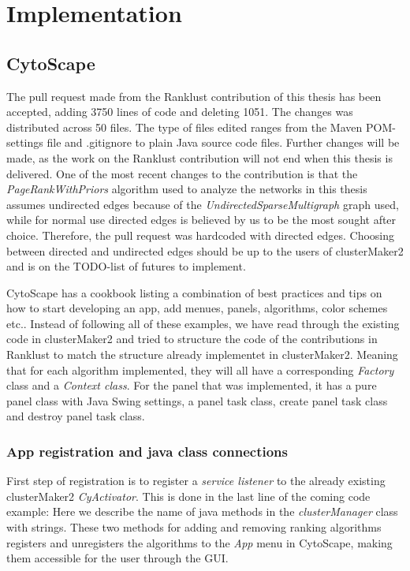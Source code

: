 \part{Implementation}
\label{pa:implementation}
\chapter{CytoScape}
The pull request\cite{git-pull-request} made from the Ranklust
contribution of this thesis has been accepted\cite{ranklust-accepted}, adding
3750 lines of code and deleting 1051. The changes was distributed across 50
files. The type of files edited ranges from the Maven POM-settings file and
.gitignore to plain Java source code files. Further changes will be made, as the
work on the Ranklust contribution will not end when this thesis is delivered.
One of the most recent changes to the contribution is that the
\textit{PageRankWithPriors} algorithm used to analyze the networks in this
thesis assumes undirected edges because of the
\textit{UndirectedSparseMultigraph} graph used, while for normal use directed
edges is believed by us to be the most sought after choice. Therefore, the pull
request was hardcoded with directed edges. Choosing between directed and
undirected edges should be up to the users of clusterMaker2 and is on the
TODO-list of futures to implement.

CytoScape has a cookbook\cite{cytoscape-cookbook} listing a combination of best
practices and tips on how to start developing an app, add menues, panels,
algorithms, color schemes etc.. Instead of following all of these examples, we
have read through the existing code in clusterMaker2\cite{cm2-github} and tried
to structure the code of the contributions in Ranklust to match the structure
already implementet in clusterMaker2. Meaning that for each algorithm
implemented, they will all have a corresponding \textit{Factory} class and a
\textit{Context class}. For the panel that was implemented, it has a pure panel
class with Java Swing\cite{java-swing} settings, a panel task class, create
panel task class and destroy panel task class.

\section{App registration and java class connections}
First step of registration is to register a \textit{service listener} to the
already existing clusterMaker2 \textit{CyActivator}. This is done in the last
line of the coming code example: Here we describe the name of java methods in
the \textit{clusterManager} class with strings. These two methods for adding and
removing ranking algorithms registers and unregisters the algorithms to the
\textit{App} menu in CytoScape, making them accessible for the user through the
GUI.


